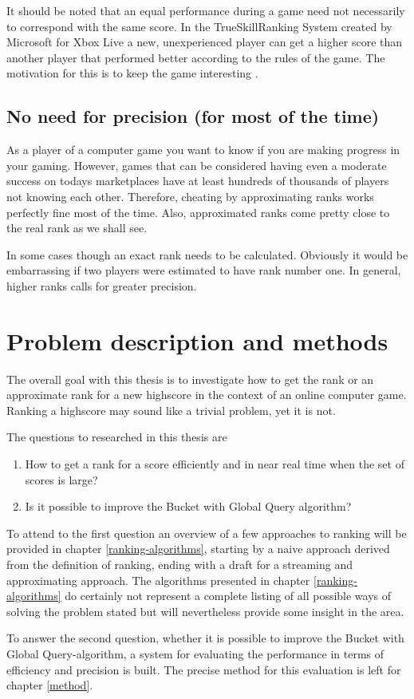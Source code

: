 It should be noted that an equal performance during a game need not necessarily to correspond with the same score. In the TrueSkill\texttrademark Ranking System created by Microsoft for Xbox Live a new, unexperienced player can get a higher score than another player that performed better according to the rules of the game. The motivation for this is to keep the game interesting \cite{trueskill}. 

\subsection*{No need for precision (for most of the time)}

As a player of a computer game you want to know if you are making progress in your gaming. However, games that can be considered having even a moderate success on todays marketplaces have at least hundreds of thousands of players not knowing each other. Therefore, cheating by approximating ranks works perfectly fine most of the time. Also, approximated ranks come pretty close to the real rank as we shall see.

In some cases though an exact rank needs to be calculated. Obviously it would be embarrassing if two players were estimated to have rank number one. In general, higher ranks calls for greater precision.

\section{Problem description and methods}

The overall goal with this thesis is to investigate how to get the rank or an approximate rank for a new highscore in the context of an online computer game. Ranking a highscore may sound like a trivial problem, yet it is not.

The questions to researched in this thesis are

\begin{enumerate}
  \setlength\itemsep{-0.4em}
\item How to get a rank for a score efficiently and in near real time when the set of scores is large?
\item Is it possible to improve the Bucket with Global Query algorithm?
\end{enumerate}

To attend to the first question an overview of a few approaches to ranking will be provided in chapter \ref{ranking-algorithms}, starting by a naive approach derived from the definition of ranking, ending with a draft for a streaming and approximating approach. The algorithms presented in chapter \ref{ranking-algorithms} do certainly not represent a complete listing of all possible ways of solving the problem stated but will nevertheless provide some insight in the area.

To answer the second question, whether it is possible to improve the Bucket with Global Query-algorithm, a system for evaluating the performance in terms of efficiency and precision is built. The precise method for this evaluation is left for chapter \ref{method}.
